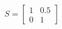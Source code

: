 \documentclass[preview]{standalone}
\begin{document}
\begin{align*}
S = \begin{bmatrix} 1 & 0.5 \\ 0 & 1 \end{bmatrix}
\end{align*}
\end{document}
